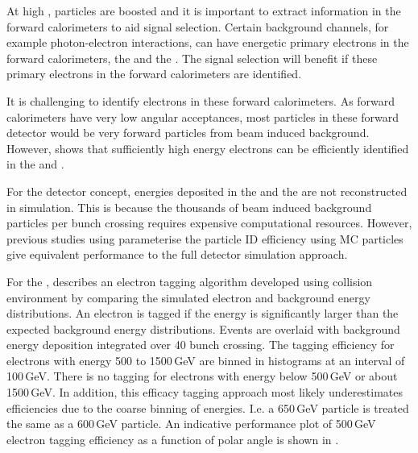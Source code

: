 At high \sqrtS, particles are boosted and it is important to extract information in the forward calorimeters to aid signal selection. Certain background channels, for example photon-electron interactions, can have energetic primary  electrons in  the forward calorimeters, the \LumiCAL and the \BeamCAL. The signal selection will benefit if these primary electrons in the forward calorimeters are identified.

It is challenging to identify electrons in these forward calorimeters. As forward calorimeters have very low angular acceptances, most particles in these forward detector would be very forward particles from beam induced background. However,  \cite{sailer2012radiation} shows that sufficiently high energy electrons can be efficiently identified in the \BeamCAL and \LumiCAL.

For the \CLICILD detector concept, energies deposited in the \LumiCAL and the \BeamCAL are not reconstructed in simulation. This is because the thousands of beam induced background particles per bunch crossing requires expensive computational resources. However, previous studies \cite{Sailer:2017onh,Lukic:forwardElectron} using parameterise the particle ID efficiency using MC particles give equivalent performance to the full detector simulation approach.



For the \BeamCAL, \cite{Sailer:2017onh} describes an electron tagging algorithm developed using  collision environment by comparing the simulated electron and background energy distributions. An electron is tagged if the energy is significantly larger than the expected background energy distributions. Events are overlaid with background energy deposition integrated over 40 bunch crossing. The tagging efficiency for electrons with energy 500 to 1500\,GeV are binned in histograms at an interval of 100\,GeV. There is no tagging for electrons with energy below 500\,GeV or about 1500\,GeV. In addition, this efficacy tagging approach  most likely underestimates efficiencies due to the coarse binning of energies. I.e. a 650\,GeV particle is treated the same as a 600\,GeV particle. An indicative performance plot of 500\,GeV electron tagging efficiency as a function of polar angle is shown in .

